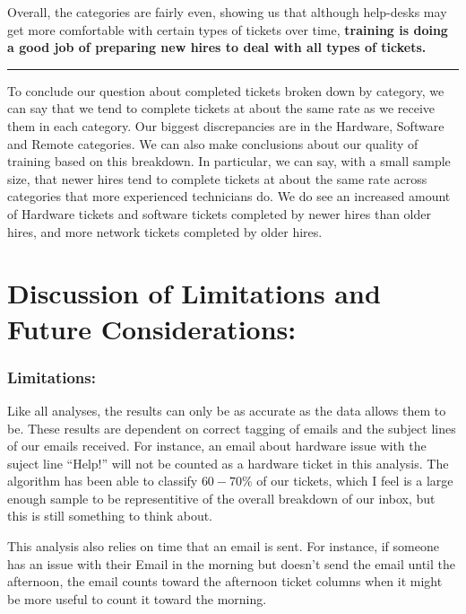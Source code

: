 \documentclass[11pt]{article}
\begin{document}
Overall, the categories are fairly even, showing us that although
help-desks may get more comfortable with certain types of tickets over
time, \textbf{training is doing a good job of preparing new hires to
deal with all types of tickets.}

\begin{center}\rule{0.5\linewidth}{\linethickness}\end{center}

To conclude our question about completed tickets broken down by
category, we can say that we tend to complete tickets at about the same
rate as we receive them in each category. Our biggest discrepancies are
in the Hardware, Software and Remote categories. We can also make
conclusions about our quality of training based on this breakdown. In
particular, we can say, with a small sample size, that newer hires tend
to complete tickets at about the same rate across categories that more
experienced technicians do. We do see an increased amount of Hardware
tickets and software tickets completed by newer hires than older hires,
and more network tickets completed by older hires.


 \hypertarget{discussion-of-limitations-and-future-considerations}{%
\section{Discussion of Limitations and Future
Considerations:}\label{discussion-of-limitations-and-future-considerations}}

 \hypertarget{limitations}{%
\subsubsection{Limitations:}\label{limitations}}

Like all analyses, the results can only be as accurate as the data
allows them to be. These results are dependent on correct tagging of
emails and the subject lines of our emails received. For instance, an
email about hardware issue with the suject line ``Help!'' will not be
counted as a hardware ticket in this analysis. The algorithm has been
able to classify \(60-70\%\) of our tickets, which I feel is a large
enough sample to be representitive of the overall breakdown of our
inbox, but this is still something to think about.

This analysis also relies on time that an email is sent. For instance,
if someone has an issue with their Email in the morning but doesn't send
the email until the afternoon, the email counts toward the afternoon
ticket columns when it might be more useful to count it toward the
morning.
\end{document}
